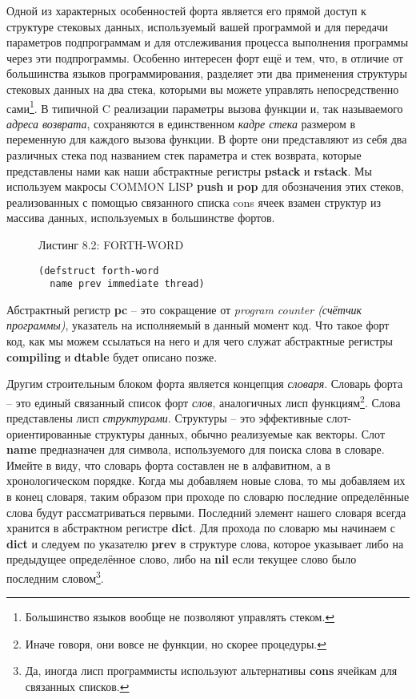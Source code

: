 Одной из характерных особенностей форта является его прямой доступ к структуре стековых данных, используемый вашей программой и для передачи параметров подпрограммам и для отслеживания процесса выполнения программы через эти подпрограммы. Особенно интересен форт ещё и тем, что, в отличие от большинства языков программирования, разделяет эти два применения структуры стековых данных на два стека, которыми вы можете управлять непосредственно сами\footnote{Большинство языков вообще не позволяют управлять стеком.}. В типичной C реализации параметры вызова функции и, так называемого \emph{адреса возврата}, сохраняются в единственном \emph{кадре стека} размером в переменную для каждого вызова функции. В форте они представляют из себя два различных стека под названием стек параметра и стек возврата, которые представлены нами как наши абстрактные регистры \textbf{pstack} и \textbf{rstack}. Мы используем макросы COMMON LISP \textbf{push} и \textbf{pop} для обозначения этих стеков, реализованных с помощью связанного списка cons ячеек взамен структур из массива данных, используемых в большинстве фортов.



\begin{figure}Листинг 8.2: FORTH-WORD\label{listing_8.2}
\listbegin
\begin{verbatim}
(defstruct forth-word
  name prev immediate thread)
\end{verbatim}
\listend
\end{figure}

Абстрактный регистр \textbf{pc} -- это сокращение от \emph{program counter (счётчик программы)}, указатель на исполняемый в данный момент код. Что такое форт код, как мы можем ссылаться на него и для чего служат абстрактные регистры \textbf{compiling} и \textbf{dtable} будет описано позже.

Другим строительным блоком форта является концепция \emph{словаря}. Словарь форта -- это единый связанный список форт \emph{слов}, аналогичных лисп функциям\footnote{Иначе говоря, они вовсе не функции, но скорее процедуры.}. Слова представлены лисп \emph{структурами}. Структуры -- это эффективные слот-ориентированные структуры данных, обычно реализуемые как векторы. Слот \textbf{name} предназначен для символа, используемого для поиска слова в словаре. Имейте в виду, что словарь форта составлен не в алфавитном, а в хронологическом порядке. Когда мы добавляем новые слова, то мы добавляем их в конец словаря, таким образом при проходе по словарю последние определённые слова будут рассматриваться первыми. Последний элемент нашего словаря всегда хранится в абстрактном регистре \textbf{dict}. Для прохода по словарю мы начинаем с \textbf{dict} и следуем по указателю \textbf{prev} в структуре слова, которое указывает либо на предыдущее определённое слово, либо на \textbf{nil} если текущее слово было последним словом\footnote{Да, иногда лисп программисты используют альтернативы \textbf{cons} ячейкам для связанных списков.}.

